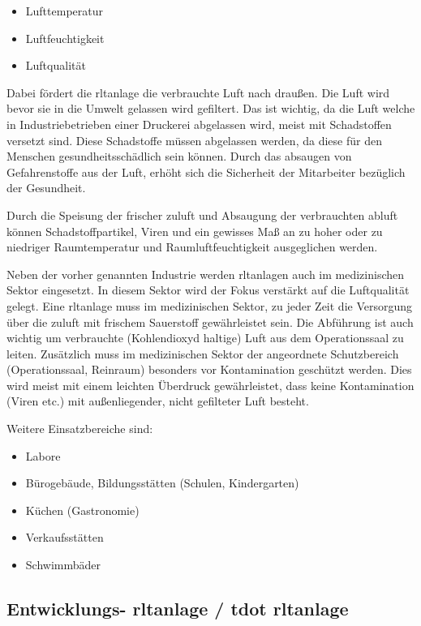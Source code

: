 \begin{itemize}
	\item Lufttemperatur
	\item Luftfeuchtigkeit
	\item Luftqualität
\end{itemize} 

Dabei fördert die \ac{rltanlage} die verbrauchte Luft nach draußen. Die Luft wird bevor sie in die Umwelt gelassen wird gefiltert. Das ist wichtig, da die Luft welche in Industriebetrieben \zB einer Druckerei abgelassen wird, meist mit Schadstoffen versetzt sind. Diese Schadstoffe müssen abgelassen werden, da diese für den Menschen gesundheitsschädlich sein können. Durch das absaugen von Gefahrenstoffe aus der Luft, erhöht sich die Sicherheit der Mitarbeiter bezüglich der Gesundheit.

Durch die Speisung der frischer \gls{zuluft} und Absaugung der verbrauchten \gls{abluft} können Schadstoffpartikel, Viren und ein gewisses Maß an zu hoher oder zu niedriger Raumtemperatur und Raumluftfeuchtigkeit ausgeglichen werden. 
\cite[vgl.][]{DGWZ:o.J.}

Neben der vorher genannten Industrie werden \ac{rltanlage}n auch im medizinischen Sektor eingesetzt. In diesem Sektor wird der Fokus verstärkt auf die Luftqualität gelegt. Eine \ac{rltanlage} muss im medizinischen Sektor, zu jeder Zeit die Versorgung über die \gls{zuluft} mit frischem Sauerstoff gewährleistet sein. Die Abführung ist auch wichtig um verbrauchte (Kohlendioxyd haltige) Luft aus dem Operationssaal zu leiten. Zusätzlich muss im medizinischen Sektor der angeordnete Schutzbereich (\zB Operationssaal, Reinraum) besonders vor Kontamination geschützt werden. Dies wird meist mit einem leichten Überdruck gewährleistet, dass keine Kontamination (Viren etc.) mit außenliegender, nicht gefilteter Luft besteht.
\cite[vgl.][]{robatherm:2019,robatherm:o.J.}

Weitere Einsatzbereiche sind:
\begin{itemize}
	\item Labore
	\item Bürogebäude, Bildungsstätten (Schulen, Kindergarten)
	\item Küchen (Gastronomie)
	\item Verkaufsstätten
	\item Schwimmbäder
\end{itemize} 
\cite[vgl.][]{robatherm:2019,induux_wiki:2023}

\subsection{Entwicklungs- \ac{rltanlage} / \gls{tdot} \ac{rltanlage}}

